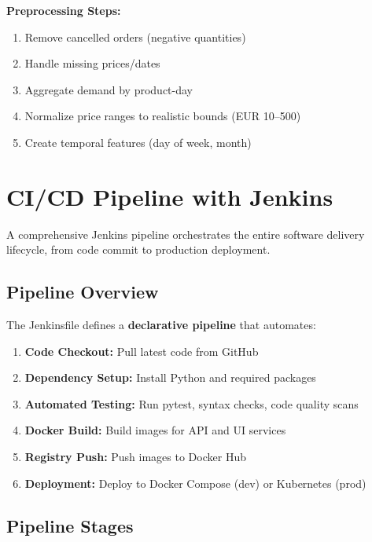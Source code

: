 \documentclass[12pt,a4paper]{report}
\begin{document}
\textbf{Preprocessing Steps:}
\begin{enumerate}[leftmargin=2em]
    \item Remove cancelled orders (negative quantities)
    \item Handle missing prices/dates
    \item Aggregate demand by product-day
    \item Normalize price ranges to realistic bounds (EUR 10--500)
    \item Create temporal features (day of week, month)
\end{enumerate}

\chapter{CI/CD Pipeline with Jenkins}

A comprehensive Jenkins pipeline orchestrates the entire software delivery lifecycle, from code commit to production deployment.

\section{Pipeline Overview}

The Jenkinsfile defines a \textbf{declarative pipeline} that automates:
\begin{enumerate}[leftmargin=2em]
    \item \textbf{Code Checkout:} Pull latest code from GitHub
    \item \textbf{Dependency Setup:} Install Python and required packages
    \item \textbf{Automated Testing:} Run pytest, syntax checks, code quality scans
    \item \textbf{Docker Build:} Build images for API and UI services
    \item \textbf{Registry Push:} Push images to Docker Hub
    \item \textbf{Deployment:} Deploy to Docker Compose (dev) or Kubernetes (prod)
\end{enumerate}

\section{Pipeline Stages}
\end{document}
